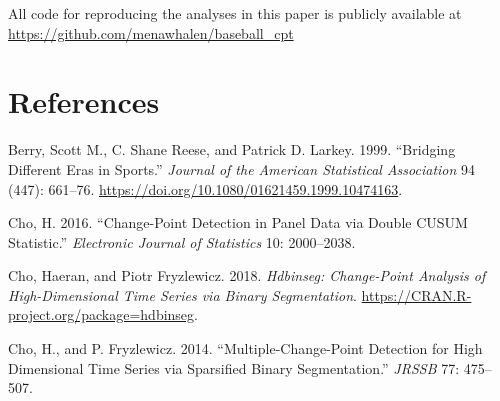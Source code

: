 \documentclass[
  12pt,
]{article}
\newlength{\cslhangindent}
\newlength{\cslentryspacingunit} %
\newenvironment{CSLReferences}[2] %
 {%
  \setlength{\parindent}{0pt}
  \ifodd #1
  \let\oldpar\par
  \def\par{\hangindent=\cslhangindent\oldpar}
  \fi
  \setlength{\parskip}{#2\cslentryspacingunit}
 }%
 {}
\begin{document}
All code for reproducing the analyses in this paper is publicly
available at \url{https://github.com/menawhalen/baseball_cpt}

\hypertarget{references}{%
\section*{References}\label{references}}

\hypertarget{refs}{}
\begin{CSLReferences}{1}{0}
\leavevmode{}%
Berry, Scott M., C. Shane Reese, and Patrick D. Larkey. 1999.
{``Bridging Different Eras in Sports.''} \emph{Journal of the American
Statistical Association} 94 (447): 661--76.
\url{https://doi.org/10.1080/01621459.1999.10474163}.

\leavevmode{}%
Cho, H. 2016. {``Change-Point Detection in Panel Data via Double CUSUM
Statistic.''} \emph{Electronic Journal of Statistics} 10: 2000--2038.

\leavevmode{}%
Cho, Haeran, and Piotr Fryzlewicz. 2018. \emph{Hdbinseg: Change-Point
Analysis of High-Dimensional Time Series via Binary Segmentation}.
\url{https://CRAN.R-project.org/package=hdbinseg}.

\leavevmode{}%
Cho, H., and P. Fryzlewicz. 2014. {``Multiple-Change-Point Detection for
High Dimensional Time Series via Sparsified Binary Segmentation.''}
\emph{JRSSB} 77: 475--507.

\end{CSLReferences}
\end{document}
